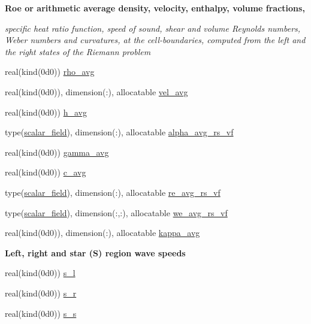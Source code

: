 \begin{Indent}\textbf{ Roe or arithmetic average density, velocity, enthalpy, volume fractions,}\par
{\em specific heat ratio function, speed of sound, shear and volume Reynolds numbers, Weber numbers and curvatures, at the cell-\/boundaries, computed from the left and the right states of the Riemann problem }\begin{DoxyCompactItemize}
\item 
real(kind(0d0)) \hyperlink{namespacem__riemann__solvers_a09cb56d16d4e4c5300be1ceee6e15acf}{rho\+\_\+avg}
\item 
real(kind(0d0)), dimension(\+:), allocatable \hyperlink{namespacem__riemann__solvers_a0fd22ed964af8ed09333c72744f561bd}{vel\+\_\+avg}
\item 
real(kind(0d0)) \hyperlink{namespacem__riemann__solvers_abff32786a11d3a71828b4e30d26773fb}{h\+\_\+avg}
\item 
type(\hyperlink{structm__derived__types_1_1scalar__field}{scalar\+\_\+field}), dimension(\+:), allocatable \hyperlink{namespacem__riemann__solvers_ac459ed9a3a6c08d8032f3e06ccf96885}{alpha\+\_\+avg\+\_\+rs\+\_\+vf}
\item 
real(kind(0d0)) \hyperlink{namespacem__riemann__solvers_a122bd2abb655fffd36e070fa376c131d}{gamma\+\_\+avg}
\item 
real(kind(0d0)) \hyperlink{namespacem__riemann__solvers_a2739a94dffd4557f28f432f86aff6c45}{c\+\_\+avg}
\item 
type(\hyperlink{structm__derived__types_1_1scalar__field}{scalar\+\_\+field}), dimension(\+:), allocatable \hyperlink{namespacem__riemann__solvers_ada8ab10b02113187113eed8f49f1ed2d}{re\+\_\+avg\+\_\+rs\+\_\+vf}
\item 
type(\hyperlink{structm__derived__types_1_1scalar__field}{scalar\+\_\+field}), dimension(\+:,\+:), allocatable \hyperlink{namespacem__riemann__solvers_a298482aa3e595dfe2401920ad841eb8f}{we\+\_\+avg\+\_\+rs\+\_\+vf}
\item 
real(kind(0d0)), dimension(\+:), allocatable \hyperlink{namespacem__riemann__solvers_aa6e6b00985be177b0a4a92f1aed48629}{kappa\+\_\+avg}
\end{DoxyCompactItemize}
\end{Indent}
\begin{Indent}\textbf{ Left, right and star (S) region wave speeds}\par
\begin{DoxyCompactItemize}
\item 
real(kind(0d0)) \hyperlink{namespacem__riemann__solvers_a83a70908c66bbb071647bb383dc72975}{s\+\_\+l}
\item 
real(kind(0d0)) \hyperlink{namespacem__riemann__solvers_ac5cbbc98622cdafe56142b26d67ad2d9}{s\+\_\+r}
\item 
real(kind(0d0)) \hyperlink{namespacem__riemann__solvers_a576586da8d3d80052a335d379001059a}{s\+\_\+s}
\end{DoxyCompactItemize}
\end{Indent}
